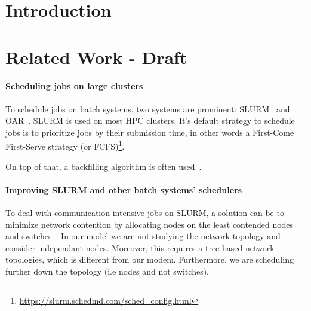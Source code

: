 \documentclass[conference,10pt]{IEEEtran}
\begin{document}
\section{Introduction}\label{sec.introduction}

\section{Related Work - Draft}\label{sec.related_work}

\paragraph{Scheduling jobs on large clusters}

To schedule jobs on batch systems, two systems are prominent: SLURM~\cite{SLURM} and OAR~\cite{oar}.
SLURM is used on most HPC clusters. It's default strategy to schedule jobs is
to prioritize jobs by their submission time, in other words a First-Come First-Serve strategy
(or FCFS)\footnote{{\scriptsize\url{https://slurm.schedmd.com/sched_config.html}}}.

On top of that, a backfilling algorithm is often used~\cite{New_Backfill}.

\paragraph{Improving SLURM and other batch systems' schedulers}

To deal with communication-intensive jobs on SLURM, a solution can be to
minimize network contention by allocating nodes on the least
contended nodes and switches~\cite{minimize_network_contention}. 
In our model we are not studying the network topology and consider independant nodes.
Moreover, this requires a tree-based network topologies, which is different from our modem.
Furthermore, we are scheduling further down the topology (i.e nodes and not switches).
\end{document}
